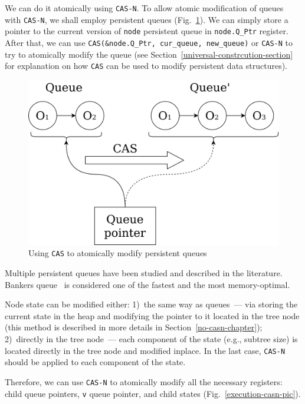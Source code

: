 \documentclass[times, dvipsnames,%
               languages={russian,english} %
              ]{itmo-student-thesis}
\begin{document}
\bigbreak

We can do it atomically using \texttt{CAS-N}. To allow atomic modification of queues with \texttt{CAS-N}, we shall employ persistent queues (Fig.~\ref{queue-cas-pic}). We can simply store a pointer to the current version of \texttt{node} persistent queue in \texttt{node.Q\_Ptr} register. After that, we can use \texttt{CAS(\&node.Q\_Ptr, cur\_queue, new\_queue)} or \texttt{CAS-N} to try to atomically modify the queue (see Section~\ref{universal-constrcution-section} for explanation on how \texttt{CAS} can be used to modify persistent data structures).

\begin{figure}[H]
  \centering
  \caption{Using \texttt{CAS} to atomically modify persistent queues}
  \label{queue-cas-pic}
  \includegraphics[width=\linewidth]{pics/queue-cas.png}
\end{figure}

Multiple persistent queues have been studied and described in the literature. Bankers queue~\cite{okasaki1999purely} is considered one of the fastest and the most memory-optimal.

Node state can be modified either: 1)~the same way as queues~--- via storing the current state in the heap and modifying the pointer to it located in the tree node (this method is described in more details in Section~\ref{no-casn-chapter}); 2)~directly in the tree node~--- each component of the state (e.g., subtree size) is located directly in the tree node and modified inplace. In the last case, \texttt{CAS-N} should be applied to each component of the state.

Therefore, we can use \texttt{CAS-N} to atomically modify all the necessary registers: child queue pointers, \texttt{v} queue pointer, and child states (Fig.~\ref{execution-casn-pic}).
\end{document}
